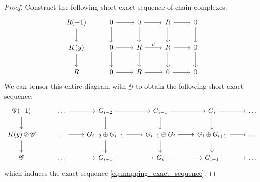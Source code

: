 \documentclass[12pt]{article}
\theoremstyle{plain}
\theoremstyle{definition}
\newcommand{\scr}[1]{\mathscr{#1}}
\begin{document}
\begin{proof}
	Construct the following short exact sequence of chain complexes:
	\begin{equation}
		\begin{tikzcd}
			R(-1)\arrow[d] & 0\arrow[r]\arrow[d] & 0\arrow[r]\arrow[d] & R\arrow[r]\arrow[d] & 0\arrow[d]\\
			K(y)\arrow[d] & 0\arrow[r]\arrow[d] & R\arrow[r,"{y}"]\arrow[d] & R\arrow[r]\arrow[d] & 0\arrow[d]\\
			R &0\arrow[r] & R\arrow[r] & 0\arrow[r] & 0
		\end{tikzcd}
	\end{equation}
	We can tensor this entire diagram with $\scr{G}$ to obtain the following short exact sequence:
	\begin{equation}
		\begin{tikzcd}
			\scr{G}(-1)\arrow[d] & \hdots\arrow[r] & G_{i-2}\arrow[r]\arrow[d] & G_{i-1}\arrow[r]\arrow[d] & G_i\arrow[r]\arrow[d] & \hdots\\
			K(y)\otimes \scr{G}\arrow[d] & \hdots\arrow[r] & G_{i-2} \oplus G_{i-1}\arrow[r]\arrow[d] & G_{i-1} \oplus G_i\arrow[r]\arrow[d]\arrow[r] & G_{i} \oplus G_{i+1}\arrow[r]\arrow[d] & \hdots\\
			\scr{G} & \hdots\arrow[r] & G_{i-1}\arrow[r] & G_i\arrow[r] & G_{i+1}\arrow[r] & \hdots
		\end{tikzcd}
	\end{equation}
	which induces the exact sequence \eqref{eq:mapping_exact_sequence}.
\end{proof}
\end{document}
